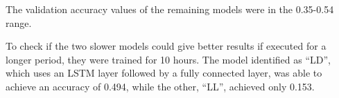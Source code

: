The validation accuracy values of the remaining models were in the 0.35-0.54 range.


To check if the two slower models could give better results if executed for a longer period, they were trained for 10 hours. The model identified as ``LD'', which uses an LSTM layer followed by a fully connected layer, was able to achieve an accuracy of 0.494, while the other, ``LL'', achieved only 0.153.


